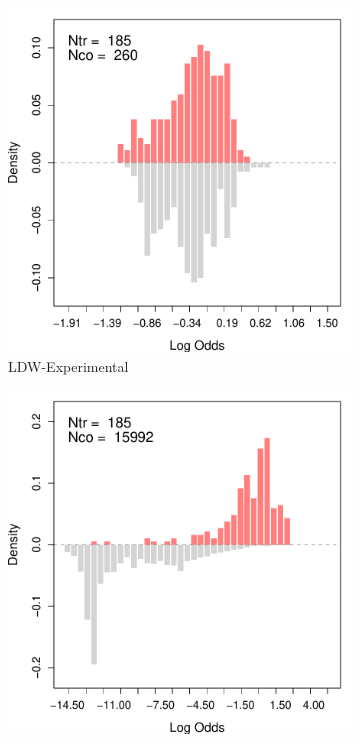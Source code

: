 \documentclass[letterpaper,12pt,leqno]{article}
\begin{document}
\begin{figure}[!th]
    \caption{Assessing the Overlap in LDW Data}\label{fig:overlap}
    \centering
    \begin{minipage}[c]{.3\textwidth}
        \centering
        \begin{subfigure}{\linewidth}
            \includegraphics[width=\linewidth]{odds_ldw_exp.pdf}
            \caption{LDW-Experimental}
        \end{subfigure}
    \end{minipage}%
    \begin{minipage}[c]{.65\textwidth}
        \centering
        \begin{subfigure}{0.45\linewidth}
            \includegraphics[width=\linewidth]{odds_ldw_cps.pdf}

\end{subfigure}
\end{minipage}
\end{figure}
\end{document}

